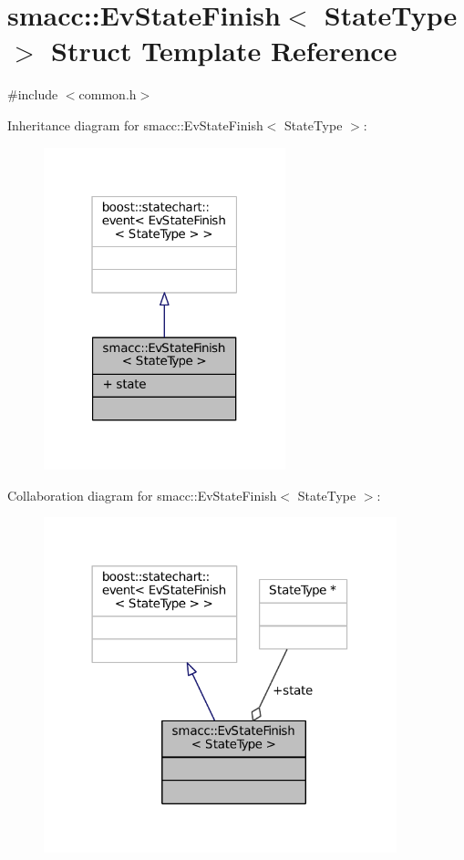 \hypertarget{structsmacc_1_1EvStateFinish}{}\section{smacc\+:\+:Ev\+State\+Finish$<$ State\+Type $>$ Struct Template Reference}
\label{structsmacc_1_1EvStateFinish}


{\ttfamily \#include $<$common.\+h$>$}



Inheritance diagram for smacc\+:\+:Ev\+State\+Finish$<$ State\+Type $>$\+:
\nopagebreak
\begin{figure}[H]
\begin{center}
\leavevmode
\includegraphics[width=199pt]{structsmacc_1_1EvStateFinish__inherit__graph}
\end{center}
\end{figure}


Collaboration diagram for smacc\+:\+:Ev\+State\+Finish$<$ State\+Type $>$\+:
\nopagebreak
\begin{figure}[H]
\begin{center}
\leavevmode
\includegraphics[width=290pt]{structsmacc_1_1EvStateFinish__coll__graph}
\end{center}
\end{figure}
